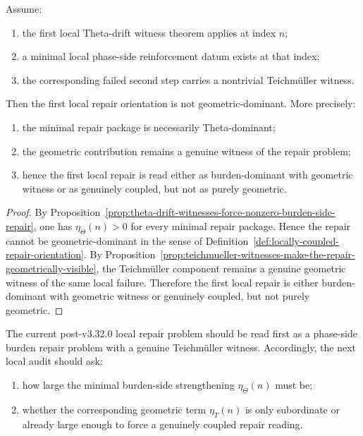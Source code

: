 \begin{theorem}
\label{thm:first-local-repair-orientation-theorem}
Assume:
\begin{enumerate}
    \item the first local Theta-drift witness theorem applies at index \(n\);
    \item a minimal local phase-side reinforcement datum exists at that index;
    \item the corresponding failed second step carries a nontrivial Teichm\"uller witness.
\end{enumerate}
Then the first local repair orientation is not geometric-dominant.
More precisely:
\begin{enumerate}
    \item the minimal repair package is necessarily Theta-dominant;
    \item the geometric contribution remains a genuine witness of the repair problem;
    \item hence the first local repair is read either as burden-dominant with geometric witness or as genuinely coupled, but not as purely geometric.
\end{enumerate}
\end{theorem}

\begin{proof}
By Proposition~\ref{prop:theta-drift-witnesses-force-nonzero-burden-side-repair}, one has \(\eta_{\Theta}(n)>0\) for every minimal repair package.
Hence the repair cannot be geometric-dominant in the sense of Definition~\ref{def:locally-coupled-repair-orientation}.
By Proposition~\ref{prop:teichmueller-witnesses-make-the-repair-geometrically-visible}, the Teichm\"uller component remains a genuine geometric witness of the same local failure.
Therefore the first local repair is either burden-dominant with geometric witness or genuinely coupled, but not purely geometric.
\end{proof}

\begin{corollary}
\label{cor:current-post-r21-repair-reading}
The current post-v3.32.0 local repair problem should be read first as a phase-side burden repair problem with a genuine Teichm\"uller witness.
Accordingly, the next local audit should ask:
\begin{enumerate}
    \item how large the minimal burden-side strengthening \(\eta_{\Theta}(n)\) must be;
    \item whether the corresponding geometric term \(\eta_{T}(n)\) is only subordinate or already large enough to force a genuinely coupled repair reading.
\end{enumerate}
\end{corollary}

